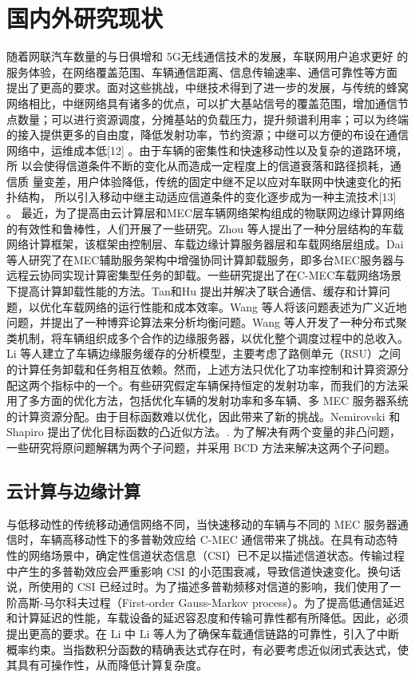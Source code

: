 \section{国内外研究现状}\label{section1-2}
\textcolor[RGB]{202,12,22}{随着网联汽车数量的与日俱增和 5G无线通信技术的发展，车联网用户追求更好
的服务体验，在网络覆盖范围、车辆通信距离、信息传输速率、通信可靠性等方面
提出了更高的要求。面对这些挑战，中继技术得到了进一步的发展，与传统的蜂窝
网络相比，中继网络具有诸多的优点，可以扩大基站信号的覆盖范围，增加通信节
点数量；可以进行资源调度，分摊基站的负载压力，提升频谱利用率；可以为终端
的接入提供更多的自由度，降低发射功率，节约资源；中继可以方便的布设在通信
网络中，运维成本低[12]
。由于车辆的密集性和快速移动性以及复杂的道路环境，所
以会使得信道条件不断的变化从而造成一定程度上的信道衰落和路径损耗，通信质
量变差，用户体验降低，传统的固定中继不足以应对车联网中快速变化的拓扑结构，
所以引入移动中继主动适应信道条件的变化逐步成为一种主流技术[13]
。}
最近，为了提高由云计算层和MEC层车辆网络架构组成的物联网边缘计算网络的有效性和鲁棒性，人们开展了一些研究。Zhou \cite{Zhou2019}等人提出了一种分层结构的车载网络计算框架，该框架由控制层、车载边缘计算服务器层和车载网络层组成。Dai \cite{Dai2022}等人研究了在MEC辅助服务架构中增强协同计算卸载服务，即多台MEC服务器与远程云协同实现计算密集型任务的卸载。一些研究提出了在C-MEC车载网络场景下提高计算卸载性能的方法。Tan和Hu \cite{Tan2018}提出并解决了联合通信、缓存和计算问题，以优化车载网络的运行性能和成本效率。Wang \cite{Wang2020}等人将该问题表述为广义近地问题，并提出了一种博弈论算法来分析均衡问题。Wang \cite{Wang2022}等人开发了一种分布式聚类机制，将车辆组织成多个合作的边缘服务器，以优化整个调度过程中的总收入。Li \cite{Li2023}等人建立了车辆边缘服务缓存的分析模型，主要考虑了路侧单元（RSU）之间的计算任务卸载和任务相互依赖。然而，上述方法只优化了功率控制和计算资源分配这两个指标中的一个。有些研究假定车辆保持恒定的发射功率，而我们的方法采用了多方面的优化方法，包括优化车辆的发射功率和多车辆、多 MEC 服务器系统的计算资源分配。由于目标函数难以优化，因此带来了新的挑战。Nemirovski 和 Shapiro 提出了优化目标函数的凸近似方法。\cite{Nemirovski2007}. 为了解决有两个变量的非凸问题，一些研究将原问题解耦为两个子问题，并采用 BCD 方法来解决这两个子问题。
\subsection{云计算与边缘计算}\label{section1-2-1}
与低移动性的传统移动通信网络不同，当快速移动的车辆与不同的 MEC 服务器通信时，车辆高移动性下的多普勒效应给 C-MEC 通信带来了挑战。在具有动态特性的网络场景中，确定性信道状态信息（CSI）已不足以描述信道状态。传输过程中产生的多普勒效应会严重影响 CSI 的小范围衰减，导致信道快速变化。换句话说，所使用的 CSI 已经过时。为了描述多普勒频移对信道的影响，我们使用了一阶高斯-马尔科夫过程（First-order Gauss-Markov process）\cite{CCO}。为了提高低通信延迟和计算延迟的性能，车载设备的延迟容忍度和传输可靠性都有所降低。因此，必须提出更高的要求。在 Li \cite{Li2020} 中 Li 等人为了确保车载通信链路的可靠性，引入了中断概率约束。当指数积分函数的精确表达式存在时，有必要考虑近似闭式表达式，使其具有可操作性，从而降低计算复杂度。

